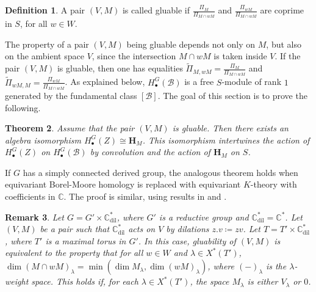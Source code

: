 \documentclass[11pt]{article}
\newcommand{\C}{\mathbb{C}}
\newcommand{\B}{\mathcal{B}}
\renewcommand{\H}{\textbf{H}}
\newcommand{\1}{\mathbb{1}}
\newcommand{\tPi}{\widetilde{\Pi}}
\newcommand{\HBM}[2]{H_\bullet^{#1}(#2)}
\newcommand{\Cdil}{\C^*_{\text{dil}}}
\newtheorem{theorem}{Theorem}[section]
\newtheorem{remark}[theorem]{Remark}
\theoremstyle{definition}
\newtheorem{definition}[theorem]{Definition}
\numberwithin{equation}{section}
\begin{document}
\begin{definition}
\label{finite_gluability_def}
    A pair $(V,M)$ is called gluable if $\frac{\Pi_{M}}{\Pi_{M\cap wM}}$ and $\frac{\Pi_{wM}}{\Pi_{M\cap wM}}$ are coprime in $S$, for all $w\in W$.
\end{definition}

The property of a pair $(V,M)$ being gluable depends not only on $M$, but also on the ambient space $V$, since the intersection $M\cap wM$ is taken inside $V$. If the pair $(V,M)$ is gluable, then one has equalities $\tPi_{M,wM} = \frac{\Pi_M}{\Pi_{M\cap wM}}$ and $\tPi_{wM,M} = \frac{\Pi_{wM}}{\Pi_{M\cap wM}}$. As explained below, $\HBM{G}{\B}$ is a free $S$-module of rank $1$ generated by the fundamental class $[\B]$. The goal of this section is to prove the following.

\begin{theorem}
\label{finite_H(Z)=H_M}
    Assume that the pair $(V,M)$ is gluable. Then there exists an algebra isomorphism $\HBM{G}{Z} \cong\H_M$. This isomorphism intertwines the action of $\HBM{G}{Z}$ on $\HBM{G}{\B}$ by convolution and the action of $\H_M$ on $S$.
\end{theorem}

If $G$ has a simply connected derived group, the analogous theorem holds when equivariant Borel-Moore homology is replaced with equivariant $K$-theory with coefficients in $\C$. The proof is similar, using results in \cite{KL} and \cite{CG}.

\begin{remark}
\label{finite_gluability_remark}
Let $G = G' \times \Cdil$, where $G'$ is a reductive group and $\Cdil=\C^*$. Let $(V,M)$ be a pair such that $\Cdil$ acts on $V$ by dilations $z.v\coloneqq zv$. Let $T=T'\times \Cdil$, where $T'$ is a maximal torus in $G'$. In this case, gluability of $(V,M)$ is equivalent to the property that for all $w\in W$ and $\lambda \in X^*(T')$, $\dim (M\cap wM)_\lambda = \min(\dim M_\lambda, \dim (wM)_\lambda)$, where $(-)_\lambda$ is the $\lambda$-weight space. This holds if, for each $\lambda\in X^*(T')$, the space $M_\lambda$ is either $V_\lambda$ or $0$.
\end{remark}
\end{document}

